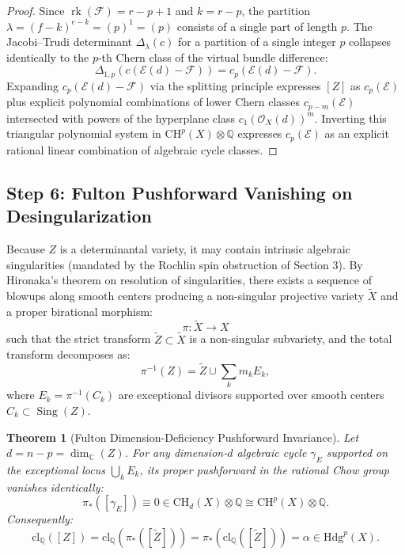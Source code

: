 \documentclass[11pt,reqno]{article}
\newtheorem{theorem}{Theorem}[section]
\theoremstyle{definition}
\DeclareMathOperator{\rk}{rk}
\DeclareMathOperator{\Sing}{Sing}
\begin{document}
\begin{proof}
Since $\rk(\mathcal{F}) = r - p + 1$ and $k = r - p$, the partition $\lambda = (f - k)^{e - k} = (p)^1 = (p)$ consists of a single part of length $p$. The Jacobi--Trudi determinant $\Delta_\lambda(c)$ for a partition of a single integer $p$ collapses identically to the $p$-th Chern class of the virtual bundle difference:
\begin{equation}
\Delta_{1,p}(c(\mathcal{E}(d) - \mathcal{F})) = c_p(\mathcal{E}(d) - \mathcal{F}).
\end{equation}
Expanding $c_p(\mathcal{E}(d) - \mathcal{F})$ via the splitting principle expresses $[Z]$ as $c_p(\mathcal{E})$ plus explicit polynomial combinations of lower Chern classes $c_{p-m}(\mathcal{E})$ intersected with powers of the hyperplane class $c_1(\mathcal{O}_X(d))^m$. Inverting this triangular polynomial system in $\mathrm{CH}^p(X) \otimes \mathbb{Q}$ expresses $c_p(\mathcal{E})$ as an explicit rational linear combination of algebraic cycle classes.
\end{proof}

\subsection{Step 6: Fulton Pushforward Vanishing on Desingularization}
Because $Z$ is a determinantal variety, it may contain intrinsic algebraic singularities (mandated by the Rochlin spin obstruction of Section 3). By Hironaka's theorem on resolution of singularities, there exists a sequence of blowups along smooth centers producing a non-singular projective variety $\tilde{X}$ and a proper birational morphism:
\begin{equation}
\pi : \tilde{X} \longrightarrow X
\end{equation}
such that the strict transform $\tilde{Z} \subset \tilde{X}$ is a non-singular subvariety, and the total transform decomposes as:
\begin{equation}
\pi^{-1}(Z) = \tilde{Z} \cup \sum_k m_k E_k,
\end{equation}
where $E_k = \pi^{-1}(C_k)$ are exceptional divisors supported over smooth centers $C_k \subset \Sing(Z)$.

\begin{theorem}[Fulton Dimension-Deficiency Pushforward Invariance]
Let $d = n - p = \dim_\mathbb{C}(Z)$. For any dimension-$d$ algebraic cycle $\gamma_E$ supported on the exceptional locus $\bigcup_k E_k$, its proper pushforward in the rational Chow group vanishes identically:
\begin{equation}
\pi_*([\gamma_E]) \equiv 0 \in \mathrm{CH}_d(X) \otimes \mathbb{Q} \cong \mathrm{CH}^p(X) \otimes \mathbb{Q}.
\end{equation}
Consequently:
\begin{equation}
\mathrm{cl}_\mathbb{Q}([Z]) = \mathrm{cl}_\mathbb{Q}(\pi_*([\tilde{Z}])) = \pi_*(\mathrm{cl}_\mathbb{Q}([\tilde{Z}])) = \alpha \in \mathrm{Hdg}^p(X).
\end{equation}
\end{theorem}
\end{document}
